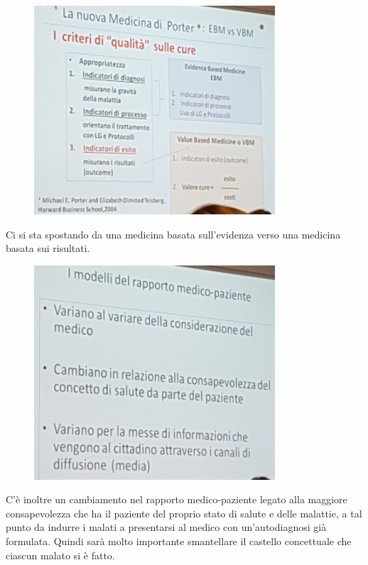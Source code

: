\begin{figure}[!ht]
\centering
	\includegraphics[width=0.8\textwidth]{29/image3.jpeg}
	\end{figure}

Ci
si sta spostando da una medicina basata sull'evidenza verso una medicina
basata sui risultati.

\begin{figure}[!ht]
\centering
	\includegraphics[width=0.8\textwidth]{29/image4.jpeg}
	\end{figure}

C'è inoltre un cambiamento nel rapporto medico-paziente legato alla
maggiore consapevolezza che ha il paziente del proprio stato di salute e
delle malattie, a tal punto da indurre i malati a presentarsi al medico
con un'autodiagnosi già formulata. Quindi sarà molto importante
smantellare il castello concettuale che ciascun malato si è fatto.


